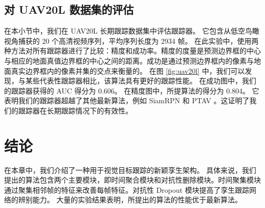 \subsection{对 UAV20L 数据集的评估}
在本小节中，我们在 UAV20L \cite{mueller2016benchmark} 长期跟踪数据集中评估跟踪器。
它包含从低空鸟瞰视角捕获的 20 个高清视频序列，平均序列长度为 2934 帧。
在此实验中，使用两种方法对所有跟踪器进行了比较：精度和成功率。精度的度量是预测边界框的中心与相应的地面真值边界框的中心之间的距离。成功是通过预测边界框内的像素与地面真实边界框内的像素并集的交点来衡量的。
在图 \ref{fig:uav20l} 中，我们可以发现，与某些代表性跟踪器相比，该算法具有更好的跟踪性能。
在成功图中，我们的跟踪器获得的 AUC 得分为 0.606。
在精度图中，所提算法的得分为 0.804。
它表明我们的跟踪器超越了其他最新算法，例如 SiamRPN \cite{SiamRPN} 和 PTAV \cite{fan2018parallel}。这证明了我们的跟踪器在长期跟踪情况下的有效性。

\section{结论}
在本章中，我们介绍了一种用于视觉目标跟踪的新颖孪生架构。
具体来说，我们提出的算法包含两个主要模块，即时间聚合模块和对抗性删除模块。时间聚集模块通过聚集相邻帧的特征来改善每帧特征。对抗性 Dropout 模块提高了孪生跟踪网络的辨别能力。
大量的实验结果表明，所提出的算法的性能优于最新算法。